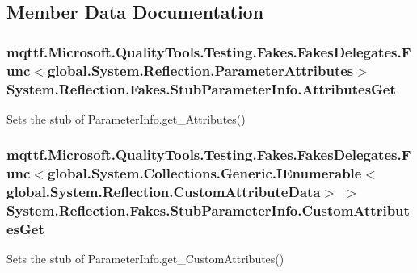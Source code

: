 \subsection{Member Data Documentation}
\hypertarget{class_system_1_1_reflection_1_1_fakes_1_1_stub_parameter_info_a8f199567d4a65bcb8d5e7b97c8e1c1fe}{
\subsubsection[{Attributes\-Get}]{\setlength{\rightskip}{0pt plus 5cm}mqttf.\-Microsoft.\-Quality\-Tools.\-Testing.\-Fakes.\-Fakes\-Delegates.\-Func$<$global.\-System.\-Reflection.\-Parameter\-Attributes$>$ System.\-Reflection.\-Fakes.\-Stub\-Parameter\-Info.\-Attributes\-Get}}\label{class_system_1_1_reflection_1_1_fakes_1_1_stub_parameter_info_a8f199567d4a65bcb8d5e7b97c8e1c1fe}


Sets the stub of Parameter\-Info.\-get\-\_\-\-Attributes()

\hypertarget{class_system_1_1_reflection_1_1_fakes_1_1_stub_parameter_info_ab2a6595070f16566d72ce775a734ba91}{
\subsubsection[{Custom\-Attributes\-Get}]{\setlength{\rightskip}{0pt plus 5cm}mqttf.\-Microsoft.\-Quality\-Tools.\-Testing.\-Fakes.\-Fakes\-Delegates.\-Func$<$global.\-System.\-Collections.\-Generic.\-I\-Enumerable$<$global.\-System.\-Reflection.\-Custom\-Attribute\-Data$>$ $>$ System.\-Reflection.\-Fakes.\-Stub\-Parameter\-Info.\-Custom\-Attributes\-Get}}\label{class_system_1_1_reflection_1_1_fakes_1_1_stub_parameter_info_ab2a6595070f16566d72ce775a734ba91}


Sets the stub of Parameter\-Info.\-get\-\_\-\-Custom\-Attributes()

